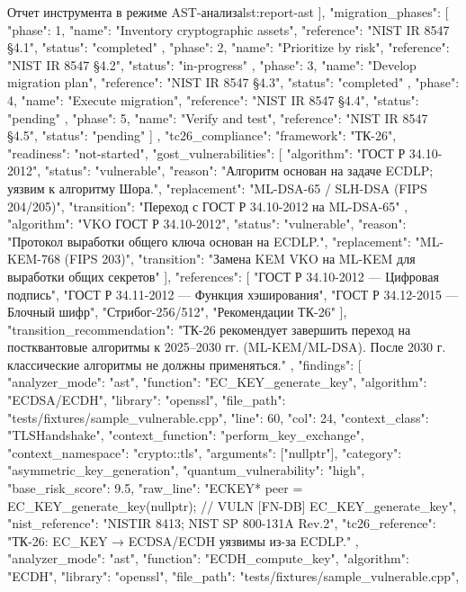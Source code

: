\documentclass{itmo-vkr}
\begin{document}
\begin{itmolisting}[JSON]{Отчет инструмента в режиме AST-анализа}{lst:report-ast}
{{{			}
			],
			"migration_phases": [
			{
				"phase": 1,
				"name": "Inventory cryptographic assets",
				"reference": "NIST IR 8547 §4.1",
				"status": "completed"
			},
			{
				"phase": 2,
				"name": "Prioritize by risk",
				"reference": "NIST IR 8547 §4.2",
				"status": "in-progress"
			},
			{
				"phase": 3,
				"name": "Develop migration plan",
				"reference": "NIST IR 8547 §4.3",
				"status": "completed"
			},
			{
				"phase": 4,
				"name": "Execute migration",
				"reference": "NIST IR 8547 §4.4",
				"status": "pending"
			},
			{
				"phase": 5,
				"name": "Verify and test",
				"reference": "NIST IR 8547 §4.5",
				"status": "pending"
			}
			]
		},
		"tc26_compliance": {
			"framework": "ТК-26",
			"readiness": "not-started",
			"gost_vulnerabilities": [
			{
				"algorithm": "ГОСТ Р 34.10-2012",
				"status": "vulnerable",
				"reason": "Алгоритм основан на задаче ECDLP; уязвим к алгоритму Шора.",
				"replacement": "ML-DSA-65 / SLH-DSA (FIPS 204/205)",
				"transition": "Переход с ГОСТ Р 34.10-2012 на ML-DSA-65"
			},
			{
				"algorithm": "VKO ГОСТ Р 34.10-2012",
				"status": "vulnerable",
				"reason": "Протокол выработки общего ключа основан на ECDLP.",
				"replacement": "ML-KEM-768 (FIPS 203)",
				"transition": "Замена KEM VKO на ML-KEM для выработки общих секретов"
			}
			],
			"references": [
			"ГОСТ Р 34.10-2012 — Цифровая подпись",
			"ГОСТ Р 34.11-2012 — Функция хэширования",
			"ГОСТ Р 34.12-2015 — Блочный шифр",
			"Стрибог-256/512",
			"Рекомендации ТК-26"
			],
			"transition_recommendation": "ТК-26 рекомендует завершить переход на постквантовые алгоритмы к 2025–2030 гг. (ML-KEM/ML-DSA). После 2030 г. классические алгоритмы не должны применяться."
		},
		"findings": [
		{
			"analyzer_mode": "ast",
			"function": "EC_KEY_generate_key",
			"algorithm": "ECDSA/ECDH",
			"library": "openssl",
			"file_path": "tests/fixtures/sample_vulnerable.cpp",
			"line": 60,
			"col": 24,
			"context_class": "TLSHandshake",
			"context_function": "perform_key_exchange",
			"context_namespace": "crypto::tls",
			"arguments": ["nullptr"],
			"category": "asymmetric_key_generation",
			"quantum_vulnerability": "high",
			"base_risk_score": 9.5,
			"raw_line": "ECKEY* peer = EC_KEY_generate_key(nullptr); // VULN [FN-DB] EC_KEY_generate_key",
			"nist_reference": "NISTIR 8413; NIST SP 800-131A Rev.2",
			"tc26_reference": "ТК-26: EC_KEY → ECDSA/ECDH уязвимы из-за ECDLP."
		},
		{
			"analyzer_mode": "ast",
			"function": "ECDH_compute_key",
			"algorithm": "ECDH",
			"library": "openssl",
			"file_path": "tests/fixtures/sample_vulnerable.cpp",
}}
\end{itmolisting}
\end{document}
